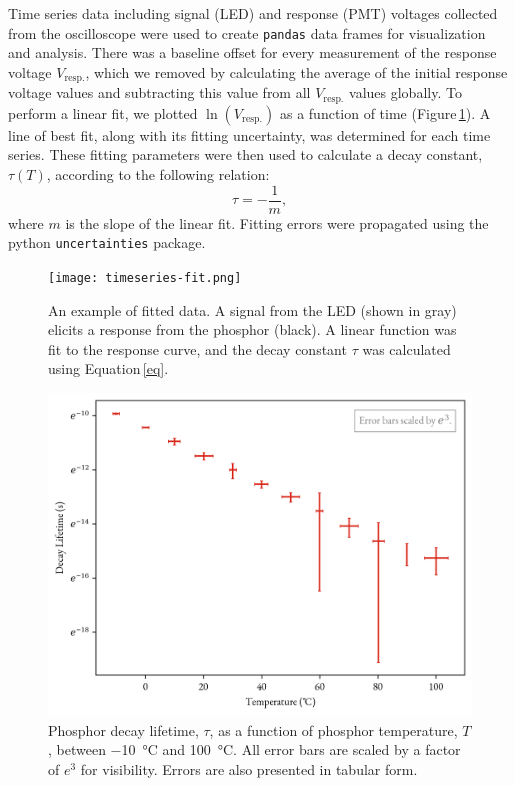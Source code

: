 \documentclass[12pt]{report}
\begin{document}
    Time series data including signal (LED) and response (PMT) voltages collected from the oscilloscope were used to create \texttt{pandas} data frames for visualization and analysis. There was a baseline offset for every measurement of the response voltage $V_{\mathrm{resp.}}$, which we removed by calculating the average of the initial response voltage values and subtracting this value from all $V_{\mathrm{resp.}}$ values globally. To perform a linear fit, we plotted $\ln(V_{\mathrm{resp.}})$ as a function of time (Figure\,\ref{fig:f1}). A line of best fit, along with its fitting uncertainty, was determined for each time series. These fitting parameters were then used to calculate a decay constant, $\tau(T)$, according to the following relation:
    \begin{equation}
        \tau = -\frac{1}{m}, \label{eq}
    \end{equation}
    where $m$ is the slope of the linear fit. Fitting errors were propagated using the python \texttt{uncertainties} package.

    \begin{figure}[tbh]
        \centering 
        \texttt{[image: timeseries-fit.png]} 
        \caption{An example of fitted data. A signal from the LED (shown in gray) elicits a response from the phosphor (black). A linear function was fit to the response curve, and the decay constant $\tau$ was calculated using Equation\,\ref{eq}.} 
        \label{fig:f1} 
    \end{figure}

    \begin{figure}[tbh] 
        \centering 
        \includegraphics[width=.7\linewidth]{image.png} 
        \caption{Phosphor decay lifetime, $\tau$, as a function of phosphor temperature, $T$, between \SI{-10}{\degreeCelsius} and \SI{100}{\degreeCelsius}. All error bars are scaled by a factor of $e^{3}$ for visibility. Errors are also presented in tabular form.} \label{fig:fig2}
    \end{figure}
\end{document}

